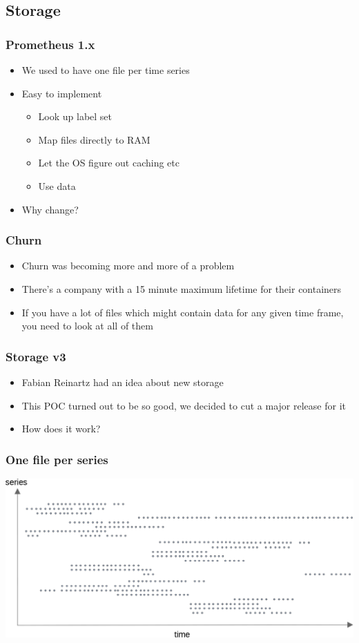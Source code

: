 \documentclass[t]{beamer}
\begin{document}
\subsection{Storage}

\begin{frame}
	\frametitle{Prometheus 1.x}
	\begin{itemize}
		\item We used to have one file per time series
		\item Easy to implement
		\begin{itemize}
			\item Look up label set
			\item Map files directly to RAM
			\item Let the OS figure out caching etc
			\item Use data
		\end{itemize}
		\item Why change?
	\end{itemize}
\end{frame}

\begin{frame}
	\frametitle{Churn}
	\begin{itemize}
		\item Churn was becoming more and more of a problem
		\item There's a company with a 15 minute maximum lifetime for their containers
		\item If you have a lot of files which might contain data for any given time frame, you need to look at all of them
	\end{itemize}
\end{frame}

\begin{frame}
	\frametitle{Storage v3}
	\begin{itemize}
		\item Fabian Reinartz had an idea about new storage
		\item This POC turned out to be so good, we decided to cut a major release for it
		\item How does it work?
	\end{itemize}
\end{frame}

\begin{frame}
	\frametitle{One file per series}
	\includegraphics[width=\textwidth]{storage--file_per_series.png}
\end{frame}
\end{document}

